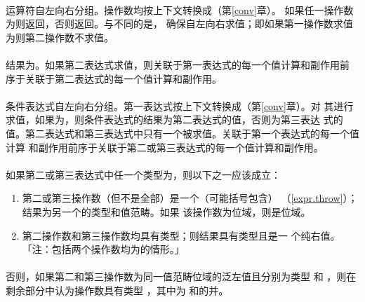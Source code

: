 
\paragraph{}
\tm{||}运算符自左向右分组。操作数均按上下文转换成（第\ref{conv}章）。
如果任一操作数为则返回，否则返回。与\tm{|}不同的是，
\tm{||}确保自左向右求值；即如果第一操作数求值为则第二操作数不求值。

\paragraph{}
结果为。如果第二表达式求值，则关联于第一表达式的每一个值计算和副作用前
序于关联于第二表达式的每一个值计算和副作用。


\paragraph{}
条件表达式自左向右分组。第一表达式按上下文转换成（第\ref{conv}章）。对
其进行求值，如果为，则条件表达式的结果为第二表达式的值，否则为第三表达
式的值。第二表达式和第三表达式中只有一个被求值。关联于第一个表达式的每一个值计算
和副作用前序于关联于第二或第三表达式的每一个值计算和副作用。

\paragraph{}
如果第二或第三表达式中任一个类型为，则以下之一应该成立：
\begin{enumerate}
  \item{第二或第三操作数（但不是全部）是一个（可能括号包含）
    （\ref{expr.throw}）；结果为另一个的类型和值范畴。如果
    该操作数为位域，则是位域。}
  \item{第二操作数和第三操作数均具有类型；则结果具有类型且是一
    个纯右值。「注：包括两个操作数均为的情形。」}
\end{enumerate}

\paragraph{}
否则，如果第二和第三操作数为同一值范畴位域的泛左值且分别为类型 和
 ，则在剩余部分中认为操作数具有类型 ，其中为
和的并。

